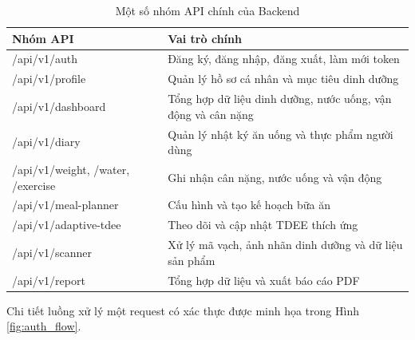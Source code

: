 \documentclass[12pt, a4paper]{report}
\begin{document}
\begin{table}[htbp]
\centering
\caption{Một số nhóm API chính của Backend}
\begin{tabular}{|p{5cm}|p{10cm}|}
\hline
\textbf{Nhóm API} & \textbf{Vai trò chính} \\
\hline
/api/v1/auth & Đăng ký, đăng nhập, đăng xuất, làm mới token \\
\hline
/api/v1/profile & Quản lý hồ sơ cá nhân và mục tiêu dinh dưỡng \\
\hline
/api/v1/dashboard & Tổng hợp dữ liệu dinh dưỡng, nước uống, vận động và cân nặng \\
\hline
/api/v1/diary & Quản lý nhật ký ăn uống và thực phẩm người dùng \\
\hline
/api/v1/weight, /water, /exercise & Ghi nhận cân nặng, nước uống và vận động \\
\hline
/api/v1/meal-planner & Cấu hình và tạo kế hoạch bữa ăn \\
\hline
/api/v1/adaptive-tdee & Theo dõi và cập nhật TDEE thích ứng \\
\hline
/api/v1/scanner & Xử lý mã vạch, ảnh nhãn dinh dưỡng và dữ liệu sản phẩm \\
\hline
/api/v1/report & Tổng hợp dữ liệu và xuất báo cáo PDF \\
\hline
\end{tabular}
\end{table}
Chi tiết luồng xử lý một request có xác thực được minh họa trong Hình \ref{fig:auth_flow}.
\end{document}
